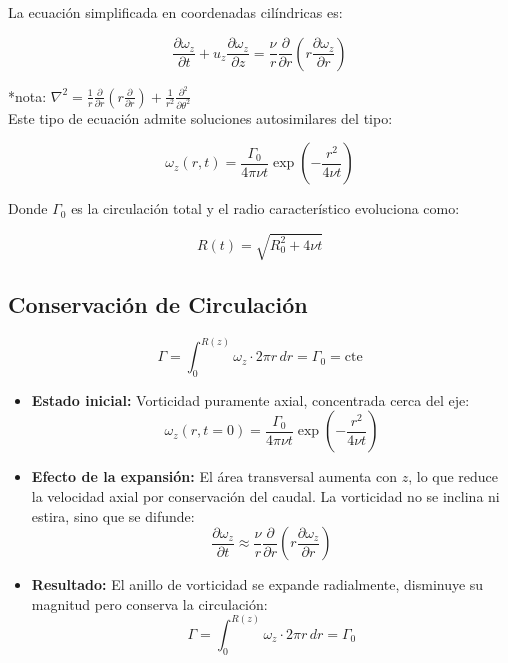 \documentclass{article}
\begin{document}
La ecuación simplificada en coordenadas cilíndricas es:

\begin{equation}
    \frac{\partial \omega_z}{\partial t} + u_z \frac{\partial \omega_z}{\partial z} = \frac{\nu}{r} \frac{\partial}{\partial r} \left( r \frac{\partial \omega_z}{\partial r} \right)
\end{equation}

*nota: $\nabla^2 = \frac{1}{r} \frac{\partial}{\partial r} \left( r \frac{\partial}{\partial r} \right) + \frac{1}{r^2} \frac{\partial^2}{\partial \theta^2}$\\


Este tipo de ecuación admite soluciones autosimilares del tipo:

\begin{equation}
    \omega_z(r,t) = \frac{\Gamma_0}{4\pi \nu t} \exp\left(-\frac{r^2}{4\nu t}\right)
\end{equation}

Donde $\Gamma_0$ es la circulación total y el radio característico evoluciona como:

\begin{equation}
    R(t) = \sqrt{R_0^2 + 4\nu t}
\end{equation}

\subsection{Conservación de Circulación}
\begin{equation}
    \Gamma = \int_0^{R(z)} \omega_z \cdot 2\pi r \, dr = \Gamma_0 = \text{cte}
\end{equation}


\begin{itemize}
    \item \textbf{Estado inicial:} Vorticidad puramente axial, concentrada cerca del eje:
    \[
    \omega_z(r,t=0) = \frac{\Gamma_0}{4\pi \nu t} \exp\left(-\frac{r^2}{4\nu t}\right)
    \]
    
    \item \textbf{Efecto de la expansión:} El área transversal aumenta con $z$, lo que reduce la velocidad axial por conservación del caudal. La vorticidad no se inclina ni estira, sino que se difunde:
    \[
    \frac{\partial \omega_z}{\partial t} \approx \frac{\nu}{r} \frac{\partial}{\partial r} \left( r \frac{\partial \omega_z}{\partial r} \right)
    \]
    
    \item \textbf{Resultado:} El anillo de vorticidad se expande radialmente, disminuye su magnitud pero conserva la circulación:
    \[
    \Gamma = \int_0^{R(z)} \omega_z \cdot 2\pi r \, dr = \Gamma_0
    \]
\end{itemize}
\end{document}
